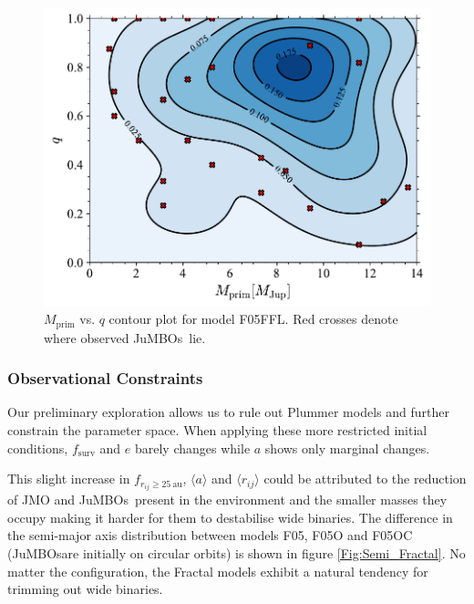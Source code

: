 \documentclass[submission,phys]{lib/SciPost}
\newcommand{\jumbos}{\mbox{JuMBOs}}
\begin{document}
   \begin{figure}
    \centering
        \includegraphics[width=\columnwidth]{figures/Fractal_rvir0.5_FF_10Myr_mass_distr.pdf}
        \caption{$M_{\mathrm{prim}}$ vs. $q$ contour plot for model F05FFL. Red crosses denote where observed \jumbos\, lie.}
         \label{Fig:SimTime_MPrimQ}
   \end{figure}
   
    \subsubsection{Observational Constraints}
    Our preliminary exploration allows us to rule out Plummer models and further constrain the parameter space. When applying these more restricted initial conditions, $f_{\mathrm{surv}}$ and $e$ barely changes while $a$ shows only marginal changes.

    This slight increase in $f_{r_{ij}\geq25\ \mathrm{au}}$, $\langle a\rangle$ and $\langle r_{ij}\rangle$ could be attributed to the reduction of JMO and \jumbos\, present in the environment and the smaller masses they occupy making it harder for them to destabilise wide binaries. The difference in the semi-major axis distribution between models F05, F05O and F05OC (\jumbos are initially on circular orbits) is shown in figure \ref{Fig:Semi_Fractal}. No matter the configuration, the Fractal models exhibit a natural tendency for trimming out wide binaries.
    
\end{document}
